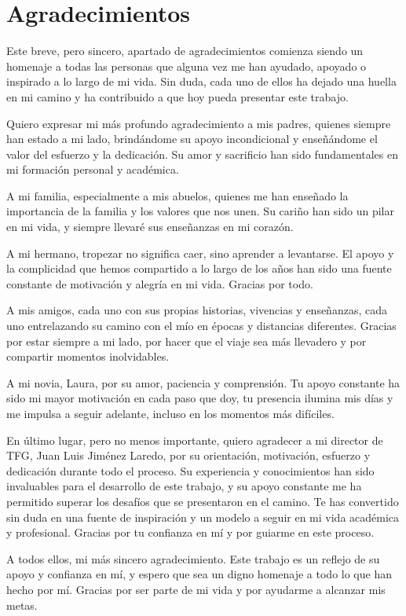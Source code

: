 \chapter*{Agradecimientos}

Este breve, pero sincero, apartado de agradecimientos comienza siendo un homenaje a todas las personas que alguna vez me han ayudado, apoyado o inspirado a lo largo de mi vida. Sin duda, cada uno de ellos ha dejado una huella en mi camino y ha contribuido a que hoy pueda presentar este trabajo.

Quiero expresar mi más profundo agradecimiento a mis padres, quienes siempre han estado a mi lado, brindándome su apoyo incondicional y enseñándome el valor del esfuerzo y la dedicación. Su amor y sacrificio han sido fundamentales en mi formación personal y académica.

A mi familia, especialmente a mis abuelos, quienes me han enseñado la importancia de la familia y los valores que nos unen. Su cariño han sido un pilar en mi vida, y siempre llevaré sus enseñanzas en mi corazón.

A mi hermano, tropezar no significa caer, sino aprender a levantarse. El apoyo y la complicidad que hemos compartido a lo largo de los años han sido una fuente constante de motivación y alegría en mi vida. Gracias por todo.

A mis amigos, cada uno con sus propias historias, vivencias y enseñanzas, cada uno entrelazando su camino con el mío en épocas y distancias diferentes. Gracias por estar siempre a mi lado, por hacer que el viaje sea más llevadero y por compartir momentos inolvidables.

A mi novia, Laura, por su amor, paciencia y comprensión. Tu apoyo constante ha sido mi mayor motivación en cada paso que doy, tu presencia ilumina mis días y me impulsa a seguir adelante, incluso en los momentos más difíciles.

En último lugar, pero no menos importante, quiero agradecer a mi director de TFG, Juan Luis Jiménez Laredo, por su orientación, motivación, esfuerzo y dedicación durante todo el proceso. Su experiencia y conocimientos han sido invaluables para el desarrollo de este trabajo, y su apoyo constante me ha permitido superar los desafíos que se presentaron en el camino. Te has convertido sin duda en una fuente de inspiración y un modelo a seguir en mi vida académica y profesional. Gracias por tu confianza en mí y por guiarme en este proceso.

A todos ellos, mi más sincero agradecimiento. Este trabajo es un reflejo de su apoyo y confianza en mí, y espero que sea un digno homenaje a todo lo que han hecho por mí. Gracias por ser parte de mi vida y por ayudarme a alcanzar mis metas.
